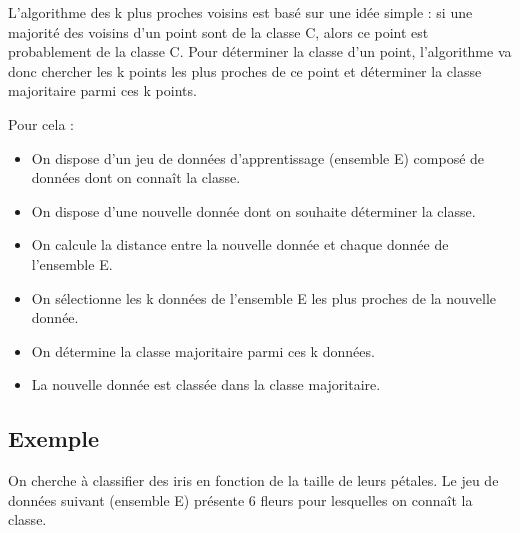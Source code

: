 \documentclass[
  a4paper,
  DIV=11,
  numbers=noendperiod]{scrartcl}
\providecommand{\tightlist}{%
  \setlength{\itemsep}{0pt}\setlength{\parskip}{0pt}}
\begin{document}
\begin{tcolorbox}[enhanced jigsaw, arc=.35mm, bottomrule=.15mm, bottomtitle=1mm, breakable, colback=white, colbacktitle=quarto-callout-tip-color!10!white, colframe=quarto-callout-tip-color-frame, coltitle=black, left=2mm, leftrule=.75mm, opacityback=0, opacitybacktitle=0.6, rightrule=.15mm, title=\textcolor{quarto-callout-tip-color}{\faLightbulb}\hspace{0.5em}{Principe}, titlerule=0mm, toprule=.15mm, toptitle=1mm]

L'algorithme des k plus proches voisins est basé sur une idée simple :
si une majorité des voisins d'un point sont de la classe C, alors ce
point est probablement de la classe C. Pour déterminer la classe d'un
point, l'algorithme va donc chercher les k points les plus proches de ce
point et déterminer la classe majoritaire parmi ces k points.

Pour cela :

\begin{itemize}
\tightlist
\item
  On dispose d'un jeu de données d'apprentissage (ensemble E) composé de
  données dont on connaît la classe.
\item
  On dispose d'une nouvelle donnée dont on souhaite déterminer la
  classe.
\item
  On calcule la distance entre la nouvelle donnée et chaque donnée de
  l'ensemble E.
\item
  On sélectionne les k données de l'ensemble E les plus proches de la
  nouvelle donnée.
\item
  On détermine la classe majoritaire parmi ces k données.
\item
  La nouvelle donnée est classée dans la classe majoritaire.
\end{itemize}

\end{tcolorbox}

\subsection{Exemple}\label{exemple}

On cherche à classifier des iris en fonction de la taille de leurs
pétales. Le jeu de données suivant (ensemble E) présente 6 fleurs pour
lesquelles on connaît la classe.
\end{document}
